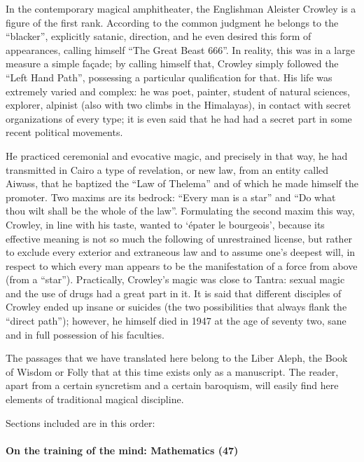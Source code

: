 In the contemporary magical amphitheater, the Englishman Aleister Crowley is a figure of the first rank. According to the common judgment he belongs to the ``blacker'', explicitly satanic, direction, and he even desired this form of appearances, calling himself ``The Great Beast 666''. In reality, this was in a large measure a simple façade; by calling himself that, Crowley simply followed the ``Left Hand Path'', possessing a particular qualification for that. His life was extremely varied and complex: he was poet, painter, student of natural sciences, explorer, alpinist (also with two climbs in the Himalayas), in contact with secret organizations of every type; it is even said that he had had a secret part in some recent political movements.

He practiced ceremonial and evocative magic, and precisely in that way, he had transmitted in Cairo a type of revelation, or new law, from an entity called Aiwass, that he baptized the ``Law of Thelema'' and of which he made himself the promoter. Two maxims are its bedrock: ``Every man is a star'' and ``Do what thou wilt shall be the whole of the law''. Formulating the second maxim this way, Crowley, in line with his taste, wanted to `épater le bourgeois', because its effective meaning is not so much the following of unrestrained license, but rather to exclude every exterior and extraneous law and to assume one's deepest will, in respect to which every man appears to be the manifestation of a force from above (from a ``star''). Practically, Crowley's magic was close to Tantra: sexual magic and the use of drugs had a great part in it. It is said that different disciples of Crowley ended up insane or suicides (the two possibilities that always flank the ``direct path''); however, he himself died in 1947 at the age of seventy two, sane and in full possession of his faculties.

The passages that we have translated here belong to the Liber Aleph, the Book of Wisdom or Folly that at this time exists only as a manuscript. The reader, apart from a certain syncretism and a certain baroquism, will easily find here elements of traditional magical discipline.

Sections included are in this order:

\paragraph{On the training of the mind: Mathematics (47)}


